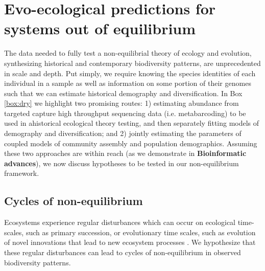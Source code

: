 \documentclass[12pt]{article}
\newcounter{Box}
\begin{document}
\section{Evo-ecological predictions for systems out of equilibrium} \label{sec:pred}

The data needed to fully test a non-equilibrial theory of ecology and
evolution, synthesizing historical and contemporary biodiversity
patterns, are unprecedented in scale and depth. Put simply, we require
knowing the species identities of each individual in a sample as well
as information on some portion of their genomes such that we can
estimate historical demography and diversification. In Box
\ref{box:dry} we
highlight two promising routes: 1) estimating abundance from targeted
capture high throughput sequencing data (i.e.  metabarcoding) to be
used in ahistorical ecological theory testing, and then separately
fitting models of demography and diversification; and 2) jointly
estimating the parameters of coupled models of community assembly and
population demographics. Assuming these two approaches are within
% 
% 
% 
reach (as we demonstrate in \textbf{Bioinformatic advances}), we now
discuss hypotheses to be tested in our non-equilibrium framework.

\subsection{Cycles of non-equilibrium}

Ecosystems experience regular disturbances which can
occur on ecological time-scales, such as primary succession, or
evolutionary time scales, such as evolution of novel innovations that
lead to new ecosystem processes \citep{redQueen, erwin2008}. We
hypothesize that these regular disturbances can lead to cycles of
non-equilibrium in observed biodiversity patterns.
\end{document}
